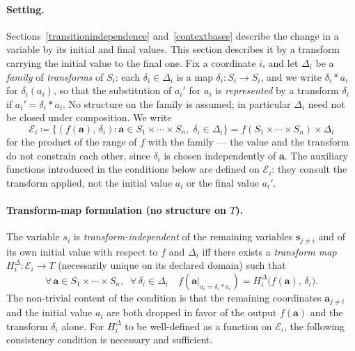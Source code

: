 \documentclass{article}
\theoremstyle{definition}
\theoremstyle{remark}
\begin{document}
\paragraph{Setting.} Sections~\ref{transitionindependence} and~\ref{contextbases} describe the change in a variable by its initial and final values. This section describes it by a transform carrying the initial value to the final one. Fix a coordinate $i$, and let $\Delta_i$ be a \textit{family} of \textit{transforms} of $S_i$: each $\delta_i \in \Delta_i$ is a map $\delta_i \colon S_i \to S_i$, and we write $\delta_i \ast a_i$ for $\delta_i(a_i)$, so that the substitution of $a_i'$ for $a_i$ is \textit{represented} by a transform $\delta_i$ if $a_i' = \delta_i \ast a_i$. No structure on the family is assumed; in particular $\Delta_i$ need not be closed under composition. We write
\[
\mathcal{E}_i \coloneqq\{(f(\boldsymbol{a}),\, \delta_i) : \boldsymbol{a} \in S_1 \times \cdots \times S_n,\; \delta_i \in \Delta_i\} = f(S_1 \times \cdots \times S_n) \times \Delta_i
\]
for the product of the range of $f$ with the family --- the value and the transform do not constrain each other, since $\delta_i$ is chosen independently of $\boldsymbol{a}$. The auxiliary functions introduced in the conditions below are defined on $\mathcal{E}_i$: they consult the transform applied, not the initial value $a_i$ or the final value $a_i'$.

\paragraph{Transform-map formulation (no structure on $T$).} The variable $s_i$ is \textit{transform-independent} of the remaining variables $\boldsymbol{s}_{j \neq i}$ and of its own initial value with respect to $f$ and $\Delta_i$ iff there exists a \textit{transform map} $H_i^\Delta \colon \mathcal{E}_i \to T$ (necessarily unique on its declared domain) such that
\begin{equation}
\label{deltatransformmap}
\forall\, \boldsymbol{a} \in S_1 \times \cdots \times S_n,\;\; \forall\, \delta_i \in \Delta_i \quad
f(\boldsymbol{a}|_{a_i = \delta_i \ast a_i}) = H_i^\Delta\bigl(f(\boldsymbol{a}),\, \delta_i\bigr).
\end{equation}
The non-trivial content of the condition is that the remaining coordinates $\boldsymbol{a}_{j \neq i}$ and the initial value $a_i$ are both dropped in favor of the output $f(\boldsymbol{a})$ and the transform $\delta_i$ alone. For $H_i^\Delta$ to be well-defined as a function on $\mathcal{E}_i$, the following consistency condition is necessary and sufficient.
\end{document}

